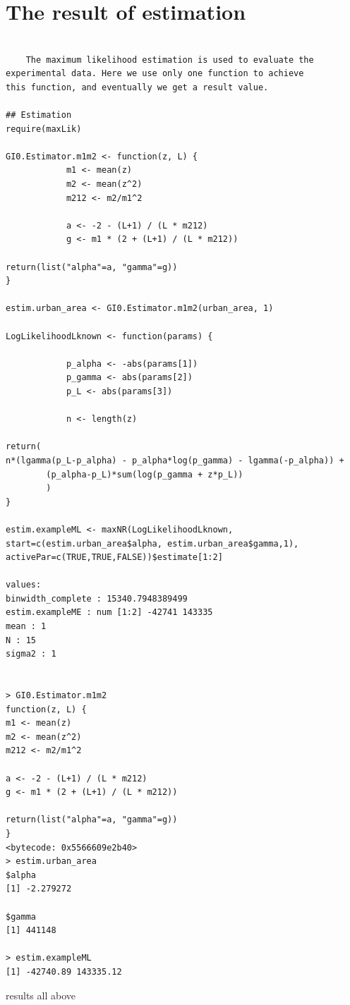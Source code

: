 \documentclass{article}
\begin{document}
	\section{The result of estimation}
	\begin{lstlisting}[frame=tb]
	
	The maximum likelihood estimation is used to evaluate the 
experimental data. Here we use only one function to achieve 
this function, and eventually we get a result value.

## Estimation
require(maxLik)

GI0.Estimator.m1m2 <- function(z, L) {
			m1 <- mean(z)
			m2 <- mean(z^2)
			m212 <- m2/m1^2

			a <- -2 - (L+1) / (L * m212)
			g <- m1 * (2 + (L+1) / (L * m212))

return(list("alpha"=a, "gamma"=g))
}

estim.urban_area <- GI0.Estimator.m1m2(urban_area, 1)

LogLikelihoodLknown <- function(params) {

			p_alpha <- -abs(params[1])
			p_gamma <- abs(params[2])
			p_L <- abs(params[3])

			n <- length(z)

return(
n*(lgamma(p_L-p_alpha) - p_alpha*log(p_gamma) - lgamma(-p_alpha)) + 
		(p_alpha-p_L)*sum(log(p_gamma + z*p_L)) 
		)
}

estim.exampleML <- maxNR(LogLikelihoodLknown, 
start=c(estim.urban_area$alpha, estim.urban_area$gamma,1), 
activePar=c(TRUE,TRUE,FALSE))$estimate[1:2]

values:
binwidth_complete : 15340.7948389499
estim.exampleME : num [1:2] -42741 143335
mean : 1
N : 15
sigma2 : 1


> GI0.Estimator.m1m2
function(z, L) {
m1 <- mean(z)
m2 <- mean(z^2)
m212 <- m2/m1^2

a <- -2 - (L+1) / (L * m212)
g <- m1 * (2 + (L+1) / (L * m212))

return(list("alpha"=a, "gamma"=g))
}
<bytecode: 0x5566609e2b40>
> estim.urban_area
$alpha
[1] -2.279272

$gamma
[1] 441148

> estim.exampleML
[1] -42740.89 143335.12

	\end{lstlisting}
results all above
\end{document}

